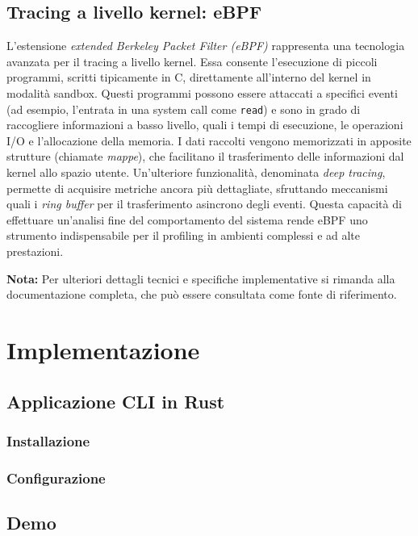 \documentclass{article}
\begin{document}
\subsection{Tracing a livello kernel: eBPF}

L'estensione \emph{extended Berkeley Packet Filter (eBPF)} rappresenta una tecnologia avanzata per il tracing a livello kernel. Essa consente l'esecuzione di piccoli programmi, scritti tipicamente in C, direttamente all'interno del kernel in modalità sandbox.  
Questi programmi possono essere attaccati a specifici eventi (ad esempio, l'entrata in una system call come \texttt{read}) e sono in grado di raccogliere informazioni a basso livello, quali i tempi di esecuzione, le operazioni I/O e l'allocazione della memoria.  
I dati raccolti vengono memorizzati in apposite strutture (chiamate \emph{mappe}), che facilitano il trasferimento delle informazioni dal kernel allo spazio utente.  
Un'ulteriore funzionalità, denominata \emph{deep tracing}, permette di acquisire metriche ancora più dettagliate, sfruttando meccanismi quali i \emph{ring buffer} per il trasferimento asincrono degli eventi. Questa capacità di effettuare un'analisi fine del comportamento del sistema rende eBPF uno strumento indispensabile per il profiling in ambienti complessi e ad alte prestazioni.

\vspace{1em}
\noindent\textbf{Nota:} Per ulteriori dettagli tecnici e specifiche implementative si rimanda alla documentazione completa, che può essere consultata come fonte di riferimento.

\clearpage
\section{Implementazione}
\subsection{Applicazione CLI in Rust}
\subsubsection{Installazione}
\subsubsection{Configurazione}
\subsection{Demo}

\clearpage
\pagestyle{plain}
\setcounter{page}{1}


\end{document}
